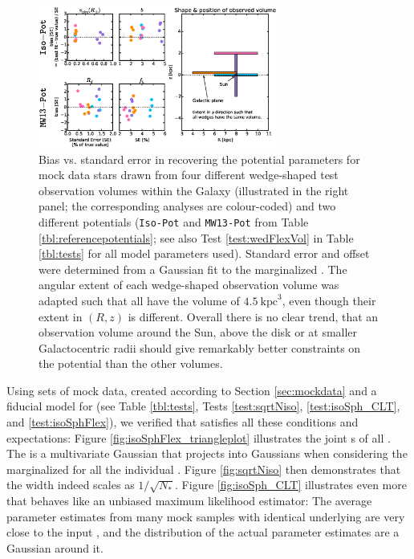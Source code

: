 

\begin{figure}[!htbp]
\centering
\includegraphics[width=0.7\textwidth]{figs/wedFlexVol_bias_vs_SE.eps}
\caption{Bias vs. standard error in recovering the potential parameters for mock data stars drawn from four different wedge-shaped test observation volumes within the Galaxy (illustrated in the right panel; the corresponding analyses are colour-coded) and two different potentials (\texttt{Iso-Pot} and \texttt{MW13-Pot} from Table \ref{tbl:referencepotentials}; see also Test \ref{test:wedFlexVol} in Table \ref{tbl:tests} for all model parameters used). Standard error and offset were determined from a Gaussian fit to the marginalized \pdf{}. The angular extent of each wedge-shaped observation volume was adapted such that all have the volume of $4.5~\text{kpc}^3$, even though their extent in $(R,z)$ is different. Overall there is no clear trend, that an observation volume around the Sun, above the disk or at smaller Galactocentric radii should give remarkably better constraints on the potential than the other volumes.}
\label{fig:wedFlexVol_bias_vs_SE}
\end{figure}



Using sets of mock data, created according to Section \ref{sec:mockdata} and a fiducial model for \pmodel{} (see Table \ref{tbl:tests}, Tests \ref{test:sqrtNiso}, \ref{test:isoSph_CLT}, and \ref{test:isoSphFlex}), we verified that \RM{} satisfies all these conditions and expectations: Figure \ref{fig:isoSphFlex_triangleplot} illustrates the joint \pdf{}s of all \pmodel{}. The \pdf{} is a multivariate Gaussian that projects into Gaussians when considering the marginalized \pdf{} for all the individual \pmodel{}. Figure \ref{fig:sqrtNiso} then demonstrates that the \pdf{} width indeed scales as $1/\sqrt{N_{*}}$. Figure \ref{fig:isoSph_CLT} illustrates even more that \RM{} behaves like an unbiased maximum likelihood estimator: The average parameter estimates from many mock samples with identical underlying \pmodel{} are very close to the input \pmodel{}, and the distribution of the actual parameter estimates are a Gaussian around it. 